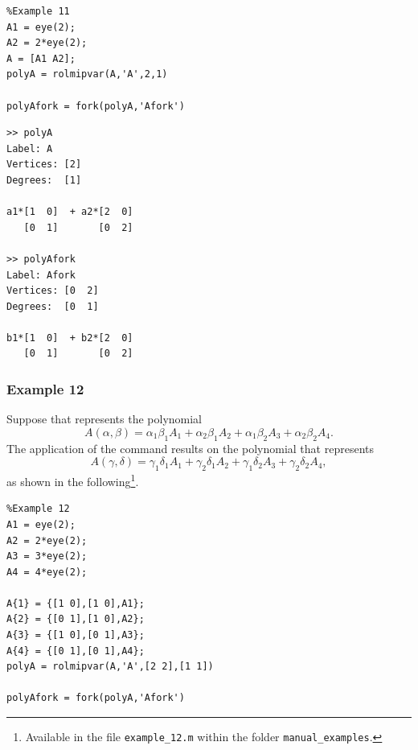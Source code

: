 \documentclass[english,11pt]{article}
\theoremstyle{break} \theorembodyfont{\small\rm}
\begin{document}
\begin{minipage}{9.5cm}
 \begin{lstlisting}
%Example 11
A1 = eye(2);
A2 = 2*eye(2);
A = [A1 A2];
polyA = rolmipvar(A,'A',2,1)

polyAfork = fork(polyA,'Afork')
 \end{lstlisting}
\end{minipage}
\vspace{0.2cm}

\begin{minipage}{9.5cm}
\begin{lstlisting}[rulecolor=\color{red}]
>> polyA
Label: A
Vertices: [2]
Degrees:  [1]
 
a1*[1  0]  + a2*[2  0] 
   [0  1]       [0  2] 

>> polyAfork
Label: Afork
Vertices: [0  2]
Degrees:  [0  1]
 
b1*[1  0]  + b2*[2  0] 
   [0  1]       [0  2] 
\end{lstlisting}
\end{minipage}
\vspace{0.2cm}




\subsubsection*{Example 12}
Suppose that  represents the polynomial
\[
 A(\alpha,\beta) = \alpha_1 \beta_1 A_1 + \alpha_2 \beta_1 A_2  + \alpha_1 \beta_2 A_3 + \alpha_2 \beta_2 A_4.
\]
The application of the command  results on the polynomial 
that represents
\[
 A(\gamma,\delta) = \gamma_1 \delta_1 A_1 + \gamma_2 \delta_1 A_2  + \gamma_1 \delta_2 A_3 + \gamma_2 \delta_2 A_4,
\]
as shown in the following\footnote{Available in the file \texttt{example\_12.m} within the folder \texttt{manual\_examples}.}.

\begin{minipage}{9.5cm}
 \begin{lstlisting}
%Example 12
A1 = eye(2);
A2 = 2*eye(2);
A3 = 3*eye(2);
A4 = 4*eye(2);

A{1} = {[1 0],[1 0],A1};
A{2} = {[0 1],[1 0],A2};
A{3} = {[1 0],[0 1],A3};
A{4} = {[0 1],[0 1],A4};
polyA = rolmipvar(A,'A',[2 2],[1 1])

polyAfork = fork(polyA,'Afork')
 \end{lstlisting}
\end{minipage}
\vspace{0.2cm}
\end{document}
